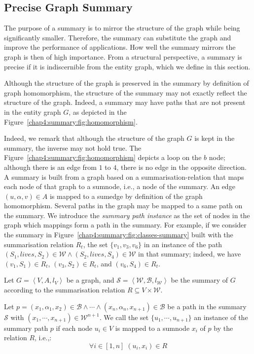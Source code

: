 \subsection{Precise Graph Summary}
\label{sec:precise-summary}

The purpose of a summary is to mirror the structure of the graph while being significantly smaller. Therefore, the summary can substitute the graph and improve the performance of applications. How well the summary mirrors the graph is then of high importance. From a structural perspective, a summary is precise if it is indiscernible from the entity graph, which we define in this section.

Although the structure of the graph is preserved in the summary by definition of graph homomorphism, the structure of the summary may not exactly reflect the structure of the graph. Indeed, a summary may have paths that are not present in the entity graph $G$, as depicted in the Figure~\ref{chap4:summary:fig:homomorphism}.

Indeed, we remark that although the structure of the graph $G$ is kept in the summary, the inverse may not hold true. The Figure~\ref{chap4:summary:fig:homomorphism} depicts a loop on the $b$ node; although there is an edge from $1$ to $4$, there is no edge in the opposite direction.\\

A summary is built from a graph based on a \gls{summarisation-relation} that maps each node of that graph to a sumnode, i.e., a node of the summary. An edge $(u, \alpha, v) \in A$ is mapped to a sumedge by definition of the graph homomorphism. Several paths in the graph may be mapped to a same path on the summary. We introduce the \emph{summary path instance} as the set of nodes in the graph which mappings form a path in the summary. For example, if we consider the summary in Figure~\ref{chap4:summary:fig:classes-summary} built with the summarisation relation $R_t$, the set $\{v_1, v_3, v_6\}$ in an instance of the path $(S_1, lives, S_2) \in \mathcal{W} \wedge (S_2, lives, S_4) \in \mathcal{W}$ in that summary; indeed, we have $(v_1, S_1) \in R_t$, $(v_3, S_2) \in R_t$, and $(v_6, S_4) \in R_t$.

\begin{definition}
\label{chap4:summary:def:summary-path-instance}
Let $G=\left\langle V, A, l_V \right\rangle$ be a graph, and $\mathcal{S} = \left\langle \mathcal{W}, \mathcal{B}, l_{\mathcal{W}} \right\rangle$ be the summary of $G$ according to the summarisation relation $R \subseteq V \times \mathcal{W}$.

Let $p = (x_1, \alpha_1, x_2) \in \mathcal{B} \wedge \cdots \wedge (x_n, \alpha_n, x_{n+1}) \in \mathcal{B}$ be a path in the summary $\mathcal{S}$ with $(x_1, \cdots, x_{n+1}) \in \mathcal{W}^{n+1}$.
We call the set $\{ u_1, \cdots, u_{n+1} \}$ an instance of the summary path $p$ if each node $u_i \in V$ is mapped to a sumnode $x_i$ of $p$ by the relation $R$, i.e.,:
$$
\forall i \in \left[1, n\right] \; (u_i, x_i) \in R
$$
\end{definition}


